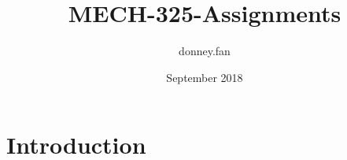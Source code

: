 \documentclass{article}
\title{MECH-325-Assignments}
\author{donney.fan }
\date{September 2018}
\begin{document}
\maketitle

\section{Introduction}
\end{document}
